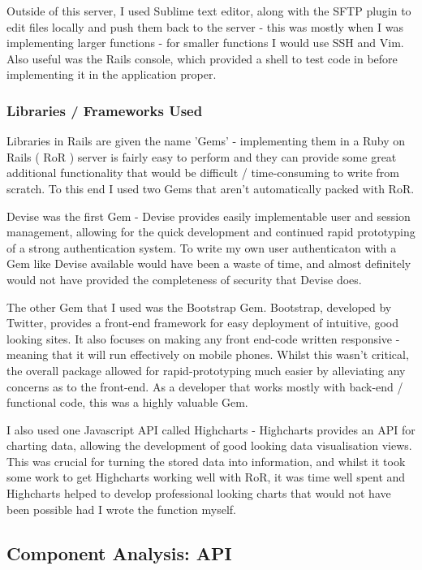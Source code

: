 \documentclass[11pt]{informatics-report}
\begin{document}
Outside of this server, I used Sublime text editor, along with the SFTP plugin to edit files locally and push them back to the server - this was mostly when I was implementing larger functions - for smaller functions I would use SSH and Vim. Also useful was the Rails console, which provided a shell to test code in before implementing it in the application proper.

\subsubsection{Libraries / Frameworks Used}

Libraries in Rails are given the name 'Gems' - implementing them in a Ruby on Rails ( RoR ) server is fairly easy to perform and they can provide some great additional functionality that would be difficult / time-consuming to write from scratch. To this end I used two Gems that aren't automatically packed with RoR.

Devise was the first Gem - Devise provides easily implementable user and session management, allowing for the quick development and continued rapid prototyping of a strong authentication system. To write my own user authenticaton with a Gem like Devise available would have been a waste of time, and almost definitely would not have provided the completeness of security that Devise does. 

The other Gem that I used was the Bootstrap Gem. Bootstrap, developed by Twitter, provides a front-end framework for easy deployment of intuitive, good looking sites. It also focuses on making any front end-code written responsive - meaning that it will run effectively on mobile phones. Whilst this wasn't critical, the overall package allowed for rapid-prototyping much easier by alleviating any concerns as to the front-end. As a developer that works mostly with back-end / functional code, this was a highly valuable Gem.

I also used one Javascript API called Highcharts - Highcharts provides an API for charting data, allowing the development of good looking data visualisation views. This was crucial for turning the stored data into information, and whilst it took some work to get Highcharts working well with RoR, it was time well spent and Highcharts helped to develop professional looking charts that would not have been possible had I wrote the function myself.

\subsection{Component Analysis: API}
\end{document}
